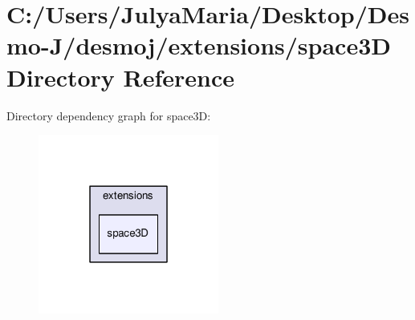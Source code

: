 \section{C\-:/\-Users/\-Julya\-Maria/\-Desktop/\-Desmo-\/\-J/desmoj/extensions/space3\-D Directory Reference}
\label{dir_5615a4ed36d86c80e93c400b69bb8105}
Directory dependency graph for space3\-D\-:
\nopagebreak
\begin{figure}[H]
\begin{center}
\leavevmode
\includegraphics[width=168pt]{dir_5615a4ed36d86c80e93c400b69bb8105_dep}
\end{center}
\end{figure}
